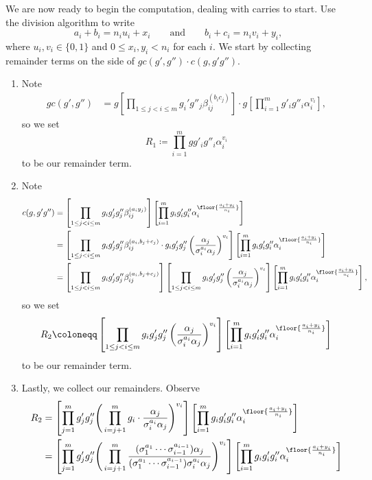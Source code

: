 \documentclass{article}
\numberwithin{equation}{section}
\begin{document}
We are now ready to begin the computation, dealing with carries to start. Use the division algorithm to write
\[a_i+b_i=n_iu_i+x_i\qquad\text{and}\qquad b_i+c_i=n_iv_i+y_i,\]
where $u_i,v_i\in\{0,1\}$ and $0\le x_i,y_i<n_i$ for each $i$. We start by collecting remainder terms on the side of $gc(g',g'')\cdot c(g,g'g'')$.
\begin{enumerate}
	\item Note
	\begin{align*}
		gc(g',g'') &= g\left[\prod_{1\le j<i\le m}g_i'g''_j\beta_{ij}^{(b_ic_j)}\right]\cdot g\left[\prod_{i=1}^mg'_ig''_i\alpha_i^{v_i}\right],
	\end{align*}
	so we set
	\[R_1\coloneqq\prod_{i=1}^mgg'_ig''_i\alpha_i^{v_i}\]
	to be our remainder term.
	\item Note
	\begin{align*}
		c(g,g'g'') &= \left[\prod_{1\le j<i\le m}g_ig'_jg''_j\beta_{ij}^{(a_iy_j)}\right]\left[\prod_{i=1}^mg_ig'_ig''_i\alpha_i^{\floor{\frac{a_i+y_i}{n_i}}}\right] \\
		&= \left[\prod_{1\le j<i\le m}g_ig'_jg''_j\beta_{ij}^{(a_i,b_j+c_j)}\cdot g_ig'_jg''_j\left(\frac{\alpha_j}{\sigma_i^{a_i}\alpha_j}\right)^{v_i}\right]\left[\prod_{i=1}^mg_ig'_ig''_i\alpha_i^{\floor{\frac{a_i+y_i}{n_i}}}\right] \\
		&= \left[\prod_{1\le j<i\le m}g_ig'_jg''_j\beta_{ij}^{(a_i,b_j+c_j)}\right]\left[\prod_{1\le j<i\le m}g_ig'_jg''_j\left(\frac{\alpha_j}{\sigma_i^{a_i}\alpha_j}\right)^{v_i}\right]\left[\prod_{i=1}^mg_ig'_ig''_i\alpha_i^{\floor{\frac{a_i+y_i}{n_i}}}\right],
	\end{align*}
	so we set
	\[R_2\coloneqq\left[\prod_{1\le j<i\le m}g_ig'_jg''_j\left(\frac{\alpha_j}{\sigma_i^{a_i}\alpha_j}\right)^{v_i}\right]\left[\prod_{i=1}^mg_ig'_ig''_i\alpha_i^{\floor{\frac{a_i+y_i}{n_i}}}\right]\]
	to be our remainder term.
	\item Lastly, we collect our remainders. Observe
	\begin{align*}
		R_2 &= \left[\prod_{j=1}^mg'_jg''_j\Bigg(\prod_{i=j+1}^mg_i\cdot\frac{\alpha_j}{\sigma_i^{a_i}\alpha_j}\Bigg)^{v_i}\right]\left[\prod_{i=1}^mg_ig'_ig''_i\alpha_i^{\floor{\frac{a_i+y_i}{n_i}}}\right] \\
		&= \left[\prod_{j=1}^mg'_jg''_j\Bigg(\prod_{i=j+1}^m\frac{(\sigma_1^{a_1}\cdots\sigma_{i-1}^{a_{i-1}})\alpha_j}{(\sigma_1^{a_1}\cdots\sigma_{i-1}^{a_{i-1}})\sigma_i^{a_i}\alpha_j}\Bigg)^{v_i}\right]\left[\prod_{i=1}^mg_ig'_ig''_i\alpha_i^{\floor{\frac{a_i+y_i}{n_i}}}\right] \\

\end{align*}
\end{enumerate}
\end{document}
